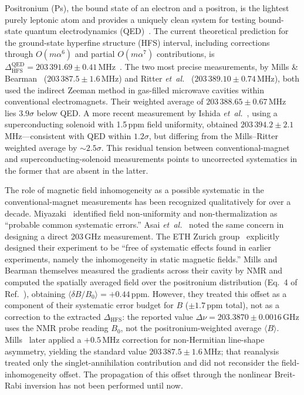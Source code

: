 \documentclass[twocolumn,pra,aps,superscriptaddress,floatfix,10pt]{revtex4-2}
\newcommand{\etal}{\textit{et~al.}}
\begin{document}
Positronium (Ps), the bound state of an electron and a positron, is the lightest purely leptonic atom and provides a uniquely clean system for testing bound-state quantum electrodynamics (QED)~\cite{Adkins2022,Karshenboim2005}. The current theoretical prediction for the ground-state hyperfine structure (HFS) interval, including corrections through $O(m\alpha^6)$ and partial $O(m\alpha^7)$ contributions, is $\Delta_\mathrm{HFS}^\mathrm{QED} = 203\,391.69 \pm 0.41$\,MHz~\cite{Kniehl2000,Melnikov2001,Baker2014}. The two most precise measurements, by Mills \& Bearman~\cite{Mills1975,Mills1983} ($203\,387.5 \pm 1.6$\,MHz) and Ritter \etal~\cite{Ritter1984} ($203\,389.10 \pm 0.74$\,MHz), both used the indirect Zeeman method in gas-filled microwave cavities within conventional electromagnets. Their weighted average of $203\,388.65 \pm 0.67$\,MHz~\cite{Adkins2022} lies $3.9\sigma$ below QED. A more recent measurement by Ishida \etal~\cite{Ishida2014}, using a superconducting solenoid with 1.5\,ppm field uniformity, obtained $203\,394.2 \pm 2.1$\,MHz---consistent with QED within $1.2\sigma$, but differing from the Mills--Ritter weighted average by $\sim 2.5\sigma$. This residual tension between conventional-magnet and superconducting-solenoid measurements points to uncorrected systematics in the former that are absent in the latter.

The role of magnetic field inhomogeneity as a possible systematic in the conventional-magnet measurements has been recognized qualitatively for over a decade. Miyazaki~\cite{Miyazaki2010} identified field non-uniformity and non-thermalization as ``probable common systematic errors.'' Asai \etal~\cite{Asai2012} noted the same concern in designing a direct 203\,GHz measurement. The ETH Zurich group~\cite{Heiss2018} explicitly designed their experiment to be ``free of systematic effects found in earlier experiments, namely the inhomogeneity in static magnetic fields.'' Mills and Bearman themselves measured the gradients across their cavity by NMR and computed the spatially averaged field over the positronium distribution (Eq.~4 of Ref.~\cite{Mills1975}), obtaining $\langle\delta B/B_0\rangle = +0.44$\,ppm. However, they treated this offset as a component of their systematic error budget for $B$ ($\pm 1.7$\,ppm total), not as a correction to the extracted $\Delta_\mathrm{HFS}$: the reported value $\Delta\nu = 203.3870 \pm 0.0016$\,GHz uses the NMR probe reading $B_0$, not the positronium-weighted average $\langle B\rangle$. Mills~\cite{Mills1983} later applied a $+0.5$\,MHz correction for non-Hermitian line-shape asymmetry, yielding the standard value $203\,387.5 \pm 1.6$\,MHz; that reanalysis treated only the singlet-annihilation contribution and did not reconsider the field-inhomogeneity offset. The propagation of this offset through the nonlinear Breit-Rabi inversion has not been performed until now.
\end{document}
